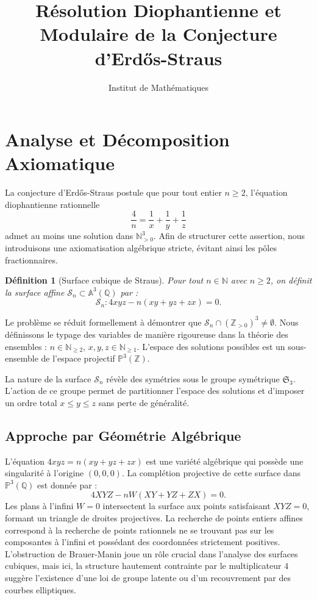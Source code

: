 \documentclass[11pt,a4paper]{article}
\title{Résolution Diophantienne et Modulaire de la Conjecture d'Erdős-Straus}
\author{Institut de Mathématiques}
\date{}
\newtheorem{definition}[theorem]{Définition}
\begin{document}
\maketitle
\tableofcontents
\newpage

\section{Analyse et Décomposition Axiomatique}
\label{sec:axiomatics}

La conjecture d'Erdős-Straus postule que pour tout entier $n \ge 2$, l'équation diophantienne rationnelle
\begin{equation}
\frac{4}{n} = \frac{1}{x} + \frac{1}{y} + \frac{1}{z}
\end{equation}
admet au moins une solution dans $\mathbb{{N}}_{>0}^3$. Afin de structurer cette assertion, nous introduisons une axiomatisation algébrique stricte, évitant ainsi les pôles fractionnaires.

\begin{definition}[Surface cubique de Straus]
Pour tout $n \in \mathbb{{N}}$ avec $n \ge 2$, on définit la surface affine $\mathcal{S}_n \subset \mathbb{A}^3(\mathbb{Q})$ par :
\begin{equation}
\mathcal{S}_n : 4xyz - n(xy + yz + zx) = 0.
\end{equation}
\end{definition}

Le problème se réduit formellement à démontrer que $\mathcal{S}_n \cap (\mathbb{Z}_{>0})^3 \neq \emptyset$. Nous définissons le typage des variables de manière rigoureuse dans la théorie des ensembles : $n \in \mathbb{{N}}_{\ge 2}$, $x, y, z \in \mathbb{{N}}_{\ge 1}$. L'espace des solutions possibles est un sous-ensemble de l'espace projectif $\mathbb{P}^3(\mathbb{Z})$.

La nature de la surface $\mathcal{S}_n$ révèle des symétries sous le groupe symétrique $\mathfrak{S}_3$. L'action de ce groupe permet de partitionner l'espace des solutions et d'imposer un ordre total $x \le y \le z$ sans perte de généralité.

\subsection{Approche par Géométrie Algébrique}
L'équation $4xyz = n(xy+yz+zx)$ est une variété algébrique qui possède une singularité à l'origine $(0,0,0)$. La complétion projective de cette surface dans $\mathbb{P}^3(\mathbb{Q})$ est donnée par :
\begin{equation}
4XYZ - nW(XY + YZ + ZX) = 0.
\end{equation}
Les plans à l'infini $W=0$ intersectent la surface aux points satisfaisant $XYZ = 0$, formant un triangle de droites projectives. La recherche de points entiers affines correspond à la recherche de points rationnels ne se trouvant pas sur les composantes à l'infini et possédant des coordonnées strictement positives. L'obstruction de Brauer-Manin joue un rôle crucial dans l'analyse des surfaces cubiques, mais ici, la structure hautement contrainte par le multiplicateur $4$ suggère l'existence d'une loi de groupe latente ou d'un recouvrement par des courbes elliptiques.
\end{document}
